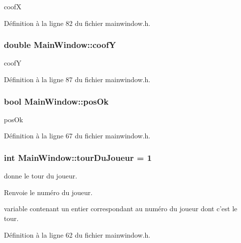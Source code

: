 coof\-X 



Définition à la ligne 82 du fichier mainwindow.\-h.

\hypertarget{class_main_window_a2f2474d5ae1f34d4800e8fb67cf609af}{
\subsubsection[{coof\-Y}]{\setlength{\rightskip}{0pt plus 5cm}double Main\-Window\-::coof\-Y}}\label{class_main_window_a2f2474d5ae1f34d4800e8fb67cf609af}


coof\-Y 



Définition à la ligne 87 du fichier mainwindow.\-h.

\hypertarget{class_main_window_a7c53199a6fe3faad4ca98a78766a2863}{
\subsubsection[{pos\-Ok}]{\setlength{\rightskip}{0pt plus 5cm}bool Main\-Window\-::pos\-Ok}}\label{class_main_window_a7c53199a6fe3faad4ca98a78766a2863}


pos\-Ok 



Définition à la ligne 67 du fichier mainwindow.\-h.

\hypertarget{class_main_window_a7b2b2add6bd8d72fb18f0f43c9998cb8}{
\subsubsection[{tour\-Du\-Joueur}]{\setlength{\rightskip}{0pt plus 5cm}int Main\-Window\-::tour\-Du\-Joueur = 1}}\label{class_main_window_a7b2b2add6bd8d72fb18f0f43c9998cb8}


donne le tour du joueur. 

\begin{DoxyReturn}{Renvoie}
le numéro du joueur.
\end{DoxyReturn}
variable contenant un entier correspondant au numéro du joueur dont c'est le tour. 

Définition à la ligne 62 du fichier mainwindow.\-h.

